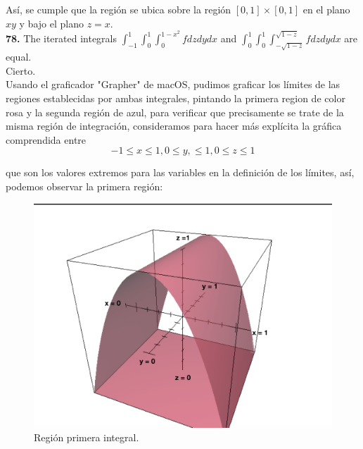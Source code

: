 \documentclass[11pt]{report}
\begin{document}
Así, se cumple que la región se ubica sobre la región $[0,1] \times [0,1]$ en el
plano $xy$ y bajo el plano $z = x$.\\

\textbf{78.} The iterated integrals $\int_{-1}^1 \int_0^1 \int_0^{1-x^2} f dz dy dx $
and $\int_0^1 \int_0^1 \int_{-\sqrt{1-z}}^{\sqrt{1-z}} f dz dy dx $ are equal. \\

Cierto.\\
Usando el graficador "Grapher" de macOS, pudimos graficar los límites de las
regiones establecidas por ambas integrales, pintando la primera region
de color rosa y la segunda región de azul, para verificar que precisamente se
trate de la misma región de integración, consideramos para hacer más explícita
la gráfica comprendida entre
	$$ -1 \leq x \leq 1, 0 \leq y, \leq 1, 0 \leq z \leq 1 $$

que son los valores extremos para las variables en la definición de los límites,
así, podemos observar la primera región:

\begin{figure}[H]
	\includegraphics[scale=0.3]{graph1.png}
	\centering
	\caption{Región primera integral.}
	\centering
\end{figure}
\end{document}
